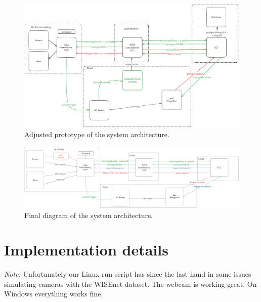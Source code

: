 \documentclass[conference]{IEEEtran}
\begin{document}
\begin{figure}[h!]
      \centering
      \includegraphics[width=1\linewidth]{images/architecturev2.excalidraw.png}
      \caption{Adjusted prototype of the system architecture.}
      \label{fig:prototype-adjusted}
\end{figure}

\begin{figure}[h!]
      \centering
      \includegraphics[width=1\linewidth]{images/architecture_final.excalidraw.png}
      \caption{Final diagram of the system architecture.}
      \label{fig:final-diagram}
\end{figure}
\newpage
\section{Implementation details}
\textit{Note:} Unfortunately our Linux run script has since the last hand-in some issues simulating cameras with the WISEnet dataset. The webcam is working great. On Windows everything works fine.
\end{document}
